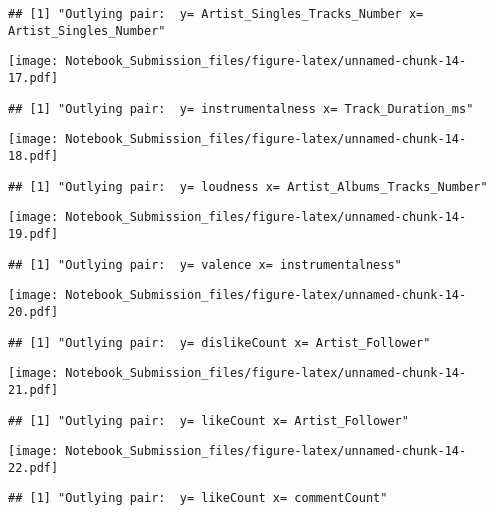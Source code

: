\documentclass[
]{article}
\begin{document}
\begin{verbatim}
## [1] "Outlying pair:  y= Artist_Singles_Tracks_Number x= Artist_Singles_Number"
\end{verbatim}

\texttt{[image: Notebook\_Submission\_files/figure-latex/unnamed-chunk-14-17.pdf]}

\begin{verbatim}
## [1] "Outlying pair:  y= instrumentalness x= Track_Duration_ms"
\end{verbatim}

\texttt{[image: Notebook\_Submission\_files/figure-latex/unnamed-chunk-14-18.pdf]}

\begin{verbatim}
## [1] "Outlying pair:  y= loudness x= Artist_Albums_Tracks_Number"
\end{verbatim}

\texttt{[image: Notebook\_Submission\_files/figure-latex/unnamed-chunk-14-19.pdf]}

\begin{verbatim}
## [1] "Outlying pair:  y= valence x= instrumentalness"
\end{verbatim}

\texttt{[image: Notebook\_Submission\_files/figure-latex/unnamed-chunk-14-20.pdf]}

\begin{verbatim}
## [1] "Outlying pair:  y= dislikeCount x= Artist_Follower"
\end{verbatim}

\texttt{[image: Notebook\_Submission\_files/figure-latex/unnamed-chunk-14-21.pdf]}

\begin{verbatim}
## [1] "Outlying pair:  y= likeCount x= Artist_Follower"
\end{verbatim}

\texttt{[image: Notebook\_Submission\_files/figure-latex/unnamed-chunk-14-22.pdf]}

\begin{verbatim}
## [1] "Outlying pair:  y= likeCount x= commentCount"
\end{verbatim}
\end{document}
